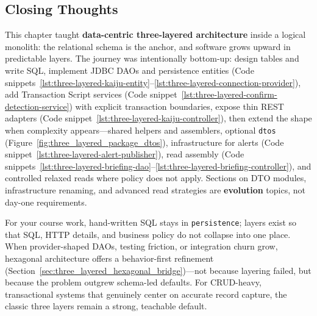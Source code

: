 \subsection{Closing Thoughts}
\label{sec:three_layered_closing}

This chapter taught \textbf{data-centric three-layered architecture} inside a logical monolith: the relational schema is the anchor, and software grows upward in predictable layers. The journey was intentionally bottom-up: design tables and write SQL, implement JDBC DAOs and persistence entities (Code snippets~\ref{lst:three-layered-kaiju-entity}--\ref{lst:three-layered-connection-provider}), add Transaction Script services (Code snippet~\ref{lst:three-layered-confirm-detection-service}) with explicit transaction boundaries, expose thin REST adapters (Code snippet~\ref{lst:three-layered-kaiju-controller}), then extend the shape when complexity appears---shared helpers and assemblers, optional \texttt{dtos} (Figure~\ref{fig:three_layered_package_dtos}), infrastructure for alerts (Code snippet~\ref{lst:three-layered-alert-publisher}), read assembly (Code snippets~\ref{lst:three-layered-briefing-dao}--\ref{lst:three-layered-briefing-controller}), and controlled relaxed reads where policy does not apply. Sections on DTO modules, infrastructure renaming, and advanced read strategies are \textbf{evolution} topics, not day-one requirements.

For your course work, hand-written SQL stays in \texttt{persistence}; layers exist so that SQL, HTTP details, and business policy do not collapse into one place. When provider-shaped DAOs, testing friction, or integration churn grow, hexagonal architecture offers a behavior-first refinement (Section~\ref{sec:three_layered_hexagonal_bridge})---not because layering failed, but because the problem outgrew schema-led defaults. For CRUD-heavy, transactional systems that genuinely center on accurate record capture, the classic three layers remain a strong, teachable default.
